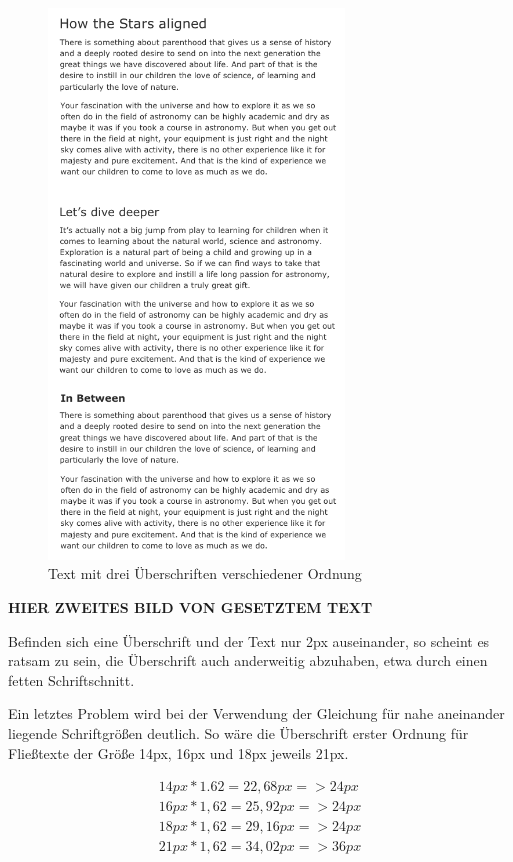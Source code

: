 \begin{figure}[h]
    \centering
    \includegraphics[width=0.7\textwidth]{images/three-headlines.png}
    \caption{Text mit drei Überschriften verschiedener Ordnung}
    \label{fig:threeHeadlines}
\end{figure}


\textbf{HIER ZWEITES BILD VON GESETZTEM TEXT}

Befinden sich eine Überschrift und der Text nur 2px auseinander, so scheint es ratsam zu sein, die Überschrift auch anderweitig abzuhaben, etwa durch einen fetten Schriftschnitt.

Ein letztes Problem wird bei der Verwendung der Gleichung für nahe aneinander liegende Schriftgrößen deutlich. So wäre die Überschrift erster Ordnung für Fließtexte der Größe 14px, 16px und 18px jeweils 21px.


\begin{equation}
\begin{split}
14px * 1.62 = 22,68px => 24px \\
16px * 1,62 = 25,92px => 24px \\
18px * 1,62 = 29,16px => 24px \\
21px * 1,62 = 34,02px => 36px \\	
\end{split}
\end{equation}


